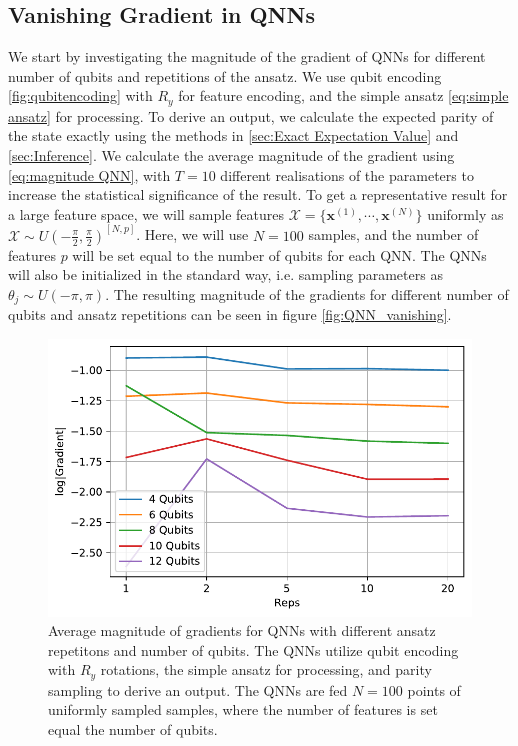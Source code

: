 \subsection{Vanishing Gradient in QNNs}\label{sec:Vanishing Gradient for QNNs}
We start by investigating the magnitude of the gradient of QNNs for different number of qubits and repetitions of the ansatz. We use qubit encoding \autoref{fig:qubitencoding} with $R_y$ for feature encoding, and the simple ansatz \autoref{eq:simple ansatz} for processing. To derive an output, we calculate the expected parity of the state exactly using the methods in \autoref{sec:Exact Expectation Value} and \autoref{sec:Inference}. We calculate the average magnitude of the gradient using \autoref{eq:magnitude QNN}, with $T=10$ different realisations of the parameters to increase the statistical significance of the result. To get a representative result for a large feature space, we will sample features $\mathcal{X} = \{\boldsymbol{x}^{(1)}, \cdots, \boldsymbol{x}^{(N)}\}$ uniformly as $\mathcal{X} \sim U(-\frac{\pi}{2}, \frac{\pi}{2})^{[N,p]}$. Here, we will use $N=100$ samples, and the number of features $p$ will be set equal to the number of qubits for each QNN. The QNNs will also be initialized in the standard way, i.e. sampling parameters as $\theta_j \sim U(-\pi, \pi)$. The resulting magnitude of the gradients for different number of qubits and ansatz repetitions can be seen in figure \autoref{fig:QNN_vanishing}.

\begin{figure}[H]
    \centering
    \includegraphics[width=12cm]{latex/figures/vanishing_gradient_QNN.pdf}
    \caption{Average magnitude of gradients for QNNs with different ansatz repetitons and number of qubits. The QNNs utilize qubit encoding with $R_y$ rotations, the simple ansatz for processing, and parity sampling to derive an output. The QNNs are fed $N=100$ points of uniformly sampled samples, where the number of features is set equal the number of qubits. }
    \label{fig:QNN_vanishing}
\end{figure}

